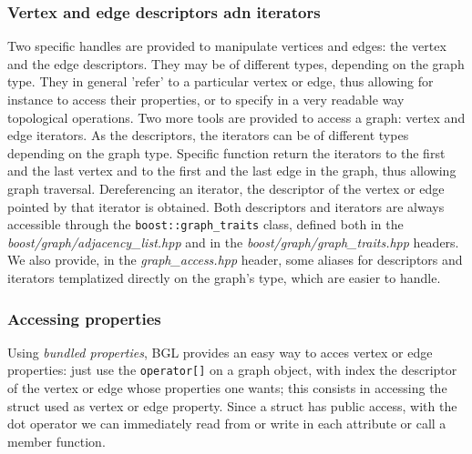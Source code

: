 \documentclass[10pt]{article} %
\newcommand{\classname}[1]{\texttt{#1}}
\begin{document}
	\subsubsection{Vertex and edge descriptors adn iterators}
	Two specific handles are provided to manipulate vertices and edges: the vertex and the edge descriptors. They may be of different types, depending on the graph type. They in general 'refer' to a particular vertex or edge, thus allowing for instance to access their properties, or to specify in a very readable way topological operations. \newline
	Two more tools are provided to access a graph: vertex and edge iterators. As the descriptors, the iterators can be of different types depending on the graph type. Specific function return the iterators to the first and the last vertex and to the first and the last edge in the graph, thus allowing graph traversal. Dereferencing an iterator, the descriptor of the vertex or edge pointed by that iterator is obtained. \newline
	Both descriptors and iterators are always accessible through the \classname{boost::graph\_traits} class, defined both in the \textit{boost/graph/adjacency\_list.hpp} and in the \textit{boost/graph/graph\_traits.hpp} headers. We also provide, in the \textit{graph\_access.hpp} header, some aliases for descriptors and iterators templatized directly on the graph's type, which are easier to handle.
	
	\subsubsection{Accessing properties}
	Using \textit{bundled properties}, BGL provides an easy way to acces vertex or edge properties: just use the \texttt{operator[]} on a graph object, with index the descriptor of the vertex or edge whose properties one wants; this consists in accessing the struct used as vertex or edge property. Since a struct has public access, with the dot operator we can immediately read from or write in each attribute or call a member function.	
	
	\newpage
\end{document}
